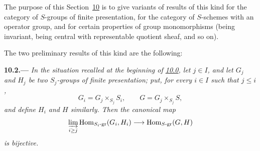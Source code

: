 The purpose of this Section~\hyperref[sec:sga3-VIB-10]{10} is
to give variants of results of this kind for the category of
\(S\)-groups of finite presentation, for the category of
\(S\)-schemes with an operator group, and for certain
properties of group monomorphisms \textup{(being invariant,
being central with representable quotient sheaf, and so on)}.

The two preliminary results of this kind are the following:

\medskip
{}\label{lem:sga3-VIB-10.2}%
\noindent\textbf{10.2.---}
\emph{In the situation recalled at the beginning of
\hyperref[par:sga3-VIB-10.0]{10.0}, let \(j\in I\), and let
\(G_j\) and \(H_j\) be two \(S_j\)-groups of finite
presentation; put, for every \(i\in I\) such that \(j\leq i\),
\[
  G_i=G_j\times_{S_j}S_i,
  \qquad
  G=G_j\times_{S_j}S,
\]
and define \(H_i\) and \(H\) similarly. Then the canonical
map}
\label{form:sga3-VIB-10.2-Hom-limit}%
\[
  \varinjlim_{i\geq j}
    \operatorname{Hom}_{S_i\text{-}\mathrm{gr}}(G_i,H_i)
    \longrightarrow
    \operatorname{Hom}_{S\text{-}\mathrm{gr}}(G,H)
\]
\emph{is bijective.}
